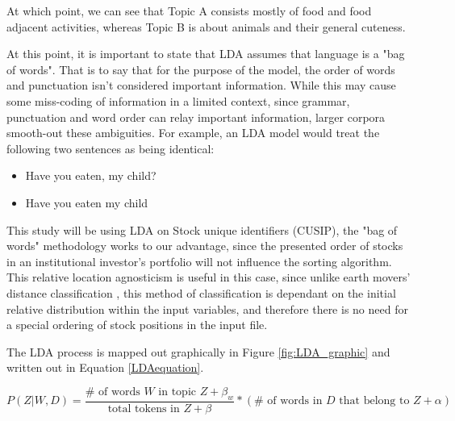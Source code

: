 At which point, we can see that Topic A consists mostly of food and food adjacent activities, whereas Topic B is about animals and their general cuteness. 

At this point, it is important to state that LDA assumes that language is a "bag of words". That is to say that for the purpose of the model, the order of words and punctuation isn't considered important information.  While this may cause some miss-coding of information in a limited context, since grammar, punctuation and word order can relay important information, larger corpora smooth-out these ambiguities. For example, an LDA model would treat the following two sentences as being identical:

\begin{itemize}	
	\item  Have you eaten, my child?
	
	\item  Have you eaten my child\textinterrobang 
\end{itemize}

This study will be using LDA on Stock unique identifiers (CUSIP), the "bag of words" methodology works to our advantage, since the presented order of stocks in an institutional investor's portfolio will not influence the sorting algorithm. This relative location agnosticism is useful in this case, since unlike earth movers' distance classification \citep{rubner2000earth}, this method of classification is dependant on the initial relative distribution within the input variables, and therefore there is no need for a special ordering of stock positions in the input file.  


The LDA process is mapped out graphically in Figure \ref{fig:LDA_graphic} and written out in Equation \ref{LDAequation}. 


\begin{equation}
P(Z|W,D) = \dfrac{\# \text{ of words } W \text{ in topic } Z + \beta_{w}}{\text{total tokens in } Z + \beta}*(\# \text{ of words in } D \text{ that belong to } Z + \alpha)
\label{LDAequation}
\end{equation}




